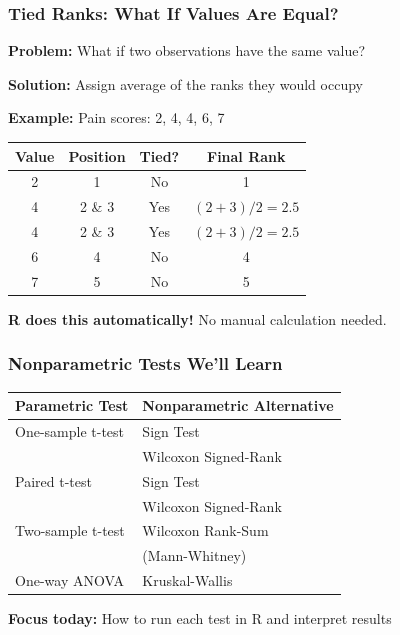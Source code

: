 \documentclass{beamer}
\begin{document}
\begin{frame}
\frametitle{Tied Ranks: What If Values Are Equal?}
\textbf{Problem:} What if two observations have the same value?

\vspace{0.3cm}
\textbf{Solution:} Assign average of the ranks they would occupy

\vspace{0.5cm}
\textbf{Example:} Pain scores: 2, 4, 4, 6, 7

\begin{center}
\begin{tabular}{cccc}
\toprule
Value & Position & Tied? & Final Rank \\
\midrule
2 & 1 & No & 1 \\
4 & 2 \& 3 & Yes & $(2+3)/2 = 2.5$ \\
4 & 2 \& 3 & Yes & $(2+3)/2 = 2.5$ \\
6 & 4 & No & 4 \\
7 & 5 & No & 5 \\
\bottomrule
\end{tabular}
\end{center}

\vspace{0.3cm}
\textbf{R does this automatically!} No manual calculation needed.
\end{frame}

\begin{frame}
\frametitle{Nonparametric Tests We'll Learn}

\begin{center}
\begin{tabular}{ll}
\toprule
\textbf{Parametric Test} & \textbf{Nonparametric Alternative} \\
\midrule
One-sample t-test & Sign Test \\
 & Wilcoxon Signed-Rank \\
\midrule
Paired t-test & Sign Test \\
 & Wilcoxon Signed-Rank \\
\midrule
Two-sample t-test & Wilcoxon Rank-Sum \\
 & (Mann-Whitney) \\
\midrule
One-way ANOVA & Kruskal-Wallis \\
\bottomrule
\end{tabular}
\end{center}

\vspace{0.5cm}
\textbf{Focus today:} How to run each test in R and interpret results
\end{frame}
\end{document}
